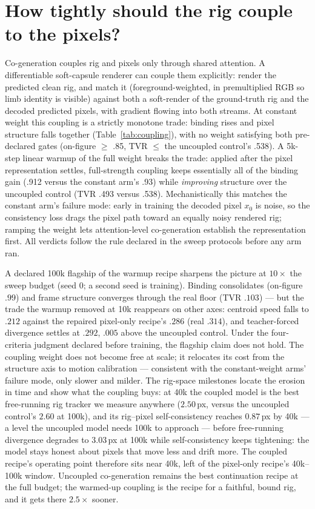 \documentclass[10pt,twocolumn]{article}
\begin{document}
\section{How tightly should the rig couple to the pixels?}
Co-generation couples rig and pixels only through shared attention. A differentiable soft-capsule renderer can couple
them explicitly: render the predicted clean rig, and match it (foreground-weighted, in premultiplied RGB so limb
identity is visible) against both a soft-render of the ground-truth rig and the decoded predicted pixels, with
gradient flowing into both streams. At constant weight this coupling is a strictly monotone trade: binding rises and
pixel structure falls together (Table~\ref{tab:coupling}), with no weight satisfying both pre-declared gates
(on-figure $\ge$ .85, TVR $\le$ the uncoupled control's .538). A 5k-step linear warmup of the full weight breaks the
trade: applied after the pixel representation settles, full-strength coupling keeps essentially all of the binding
gain (.912 versus the constant arm's .93) while \emph{improving} structure over the uncoupled control (TVR .493
versus .538). Mechanistically this matches the constant arm's failure mode: early in training the decoded pixel
$x_0$ is noise, so the consistency loss drags the pixel path toward an equally noisy rendered rig; ramping the weight
lets attention-level co-generation establish the representation first. All verdicts follow the rule declared in the
sweep protocols before any arm ran.

A declared 100k flagship of the warmup recipe sharpens the picture at $10\times$ the sweep budget (seed 0; a second
seed is training). Binding consolidates (on-figure $.99$) and frame structure converges through the real floor (TVR
$.103$) — but the trade the warmup removed at 10k reappears on other axes: centroid speed falls to $.212$ against
the repaired pixel-only recipe's $.286$ (real $.314$), and teacher-forced divergence settles at $.292$, $.005$ above
the uncoupled control. Under the four-criteria judgment declared before training, the flagship claim does not hold.
The coupling weight does not become free at scale; it relocates its cost from the structure axis to motion
calibration — consistent with the constant-weight arms' failure mode, only slower and milder. The rig-space
milestones locate the erosion in time and show what the coupling buys: at 40k the coupled model is the best
free-running rig tracker we measure anywhere ($2.50$\,px, versus the uncoupled control's $2.60$ at 100k), and its
rig--pixel self-consistency reaches $0.87$\,px by 40k — a level the uncoupled model needs 100k to approach — before
free-running divergence degrades to $3.03$\,px at 100k while self-consistency keeps tightening: the model stays
honest about pixels that move less and drift more. The coupled recipe's operating point therefore sits near 40k,
left of the pixel-only recipe's 40k--100k window. Uncoupled co-generation remains the best continuation recipe at
the full budget; the warmed-up coupling is the recipe for a faithful, bound rig, and it gets there
$2.5\times$ sooner. %
\end{document}
